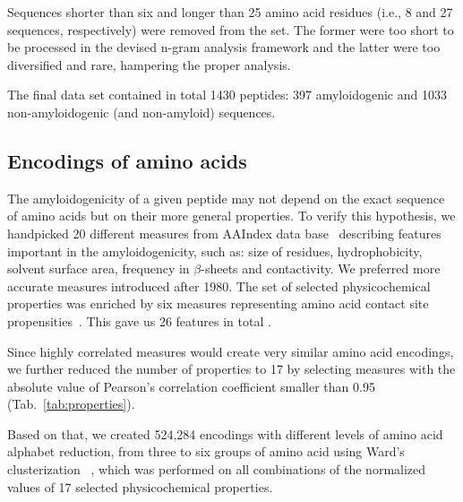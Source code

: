 \documentclass[fleqn,10pt,twoside]{gcb15submission}
\begin{document}
  Sequences shorter than six and longer than 25 amino acid residues (i.e., 8 and 
27 sequences, respectively) were removed from the set. The former were too short 
to be processed in the devised n-gram analysis framework and the latter were too 
diversified and rare, hampering the proper analysis.

  The final data set contained in total 1430 peptides: 397 amyloidogenic 
%
%
%
%
%
and 1033 non-amyloidogenic (and non-amyloid) sequences. 

\subsection{Encodings of amino acids}

The amyloidogenicity of a given peptide may not depend on the exact sequence of 
amino acids but on their more general properties. To verify this hypothesis, we 
handpicked 20 different measures from AAIndex data base~\citep{kawashima_aaindex:_2008} 
describing features important in the amyloidogenicity, such as: size of 
residues, hydrophobicity, solvent surface area, frequency in $\beta$-sheets and 
contactivity. We preferred more accurate measures introduced after 1980. 
The set of selected physicochemical properties was enriched by 
six measures representing amino acid contact site 
propensities~\cite{wozniak_characteristics_2014}. This gave us  26 features in total .

  Since highly correlated measures would create very similar amino acid 
encodings, we further reduced the number of properties to 17 by selecting 
measures with the absolute value of Pearson's correlation coefficient smaller 
than 0.95 (Tab.~\ref{tab:properties}). 

  Based on that, we created 524,284 encodings with different levels of 
amino acid alphabet reduction, from three to six groups of amino acid  using Ward's 
clusterization ~\citep{joe_h._ward_jr_hierarchical_1963},  which was performed 
on all combinations of the normalized values of 17 selected physicochemical properties.
\end{document}
